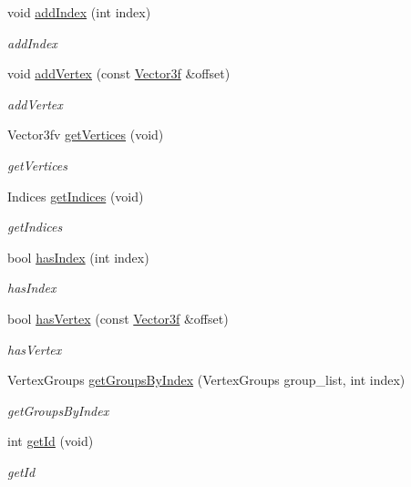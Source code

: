 \begin{DoxyCompactItemize}
void \hyperlink{classEngine_1_1VertexGroup_a0bdfb58046771e1897931539fee1c742}{add\+Index} (int index)
\begin{DoxyCompactList}\small\item\em add\+Index \end{DoxyCompactList}\item 
void \hyperlink{classEngine_1_1VertexGroup_aa679b6ec6ed7fc5b9feb81792fa6f201}{add\+Vertex} (const \hyperlink{classVector3}{Vector3f} \&offset)
\begin{DoxyCompactList}\small\item\em add\+Vertex \end{DoxyCompactList}\item 
Vector3fv \hyperlink{classEngine_1_1VertexGroup_a669ec661e426d21e9dae5a9e0a1de1b4}{get\+Vertices} (void)
\begin{DoxyCompactList}\small\item\em get\+Vertices \end{DoxyCompactList}\item 
Indices \hyperlink{classEngine_1_1VertexGroup_a4d75c5c0821c43294e054be73631da9e}{get\+Indices} (void)
\begin{DoxyCompactList}\small\item\em get\+Indices \end{DoxyCompactList}\item 
bool \hyperlink{classEngine_1_1VertexGroup_a032c2a0325a15b285456ec06acdbc22e}{has\+Index} (int index)
\begin{DoxyCompactList}\small\item\em has\+Index \end{DoxyCompactList}\item 
bool \hyperlink{classEngine_1_1VertexGroup_ae64ce50723304561928e83b7cca33f13}{has\+Vertex} (const \hyperlink{classVector3}{Vector3f} \&offset)
\begin{DoxyCompactList}\small\item\em has\+Vertex \end{DoxyCompactList}\item 
Vertex\+Groups \hyperlink{classEngine_1_1VertexGroup_a691df31aac04304267849f6d43a764bc}{get\+Groups\+By\+Index} (Vertex\+Groups group\+\_\+list, int index)
\begin{DoxyCompactList}\small\item\em get\+Groups\+By\+Index \end{DoxyCompactList}\item 
int \hyperlink{classEngine_1_1VertexGroup_a6c0d40d10387249cd17dfaee82db2449}{get\+Id} (void)
\begin{DoxyCompactList}\small\item\em get\+Id \end{DoxyCompactList}\end{DoxyCompactItemize}
